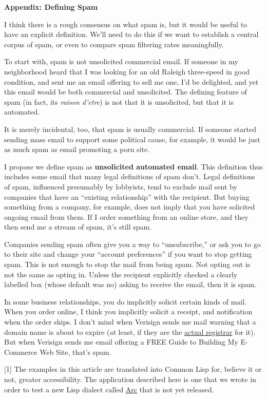 \textbf{Appendix: Defining Spam}

I think there is a rough consensus on what spam is, but it would be
useful to have an explicit definition. We'll need to do this if we want
to establish a central corpus of spam, or even to compare spam filtering
rates meaningfully.

To start with, spam is not unsolicited commercial email. If someone in
my neighborhood heard that I was looking for an old Raleigh three-speed
in good condition, and sent me an email offering to sell me one, I'd be
delighted, and yet this email would be both commercial and unsolicited.
The defining feature of spam (in fact, its \emph{raison d'etre}) is not
that it is unsolicited, but that it is automated.

It is merely incidental, too, that spam is usually commercial. If
someone started sending mass email to support some political cause, for
example, it would be just as much spam as email promoting a porn site.

I propose we define spam as \textbf{unsolicited automated email}. This
definition thus includes some email that many legal definitions of spam
don't. Legal definitions of spam, influenced presumably by lobbyists,
tend to exclude mail sent by companies that have an ``existing
relationship'' with the recipient. But buying something from a company,
for example, does not imply that you have solicited ongoing email from
them. If I order something from an online store, and they then send me a
stream of spam, it's still spam.

Companies sending spam often give you a way to ``unsubscribe,'' or ask
you to go to their site and change your ``account preferences'' if you
want to stop getting spam. This is not enough to stop the mail from
being spam. Not opting out is not the same as opting in. Unless the
recipient explicitly checked a clearly labelled box (whose default was
no) asking to receive the email, then it is spam.

In some business relationships, you do implicitly solicit certain kinds
of mail. When you order online, I think you implicitly solicit a
receipt, and notification when the order ships. I don't mind when
Verisign sends me mail warning that a domain name is about to expire (at
least, if they are the
\href{http://siliconvalley.internet.com/news/article.php/1441651}{actual
registrar} for it). But when Verisign sends me email offering a FREE
Guide to Building My E-Commerce Web Site, that's spam.

{[}1{]} The examples in this article are translated into Common Lisp
for, believe it or not, greater accessibility. The application described
here is one that we wrote in order to test a new Lisp dialect called
\href{arc.html}{Arc} that is not yet released.

